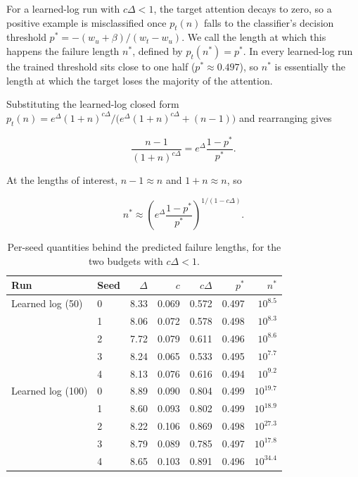 \documentclass{article}
\begin{document}
For a learned-log run with $c\Delta<1$, the target attention decays to zero, so
a positive example is misclassified once $p_t(n)$ falls to the classifier's
decision threshold $p^{\ast}=-(w_u+\beta)/(w_t-w_u)$. We call the length at
which this happens the failure length $n^{\ast}$, defined by
$p_t(n^{\ast})=p^{\ast}$. In every learned-log run the trained threshold sits
close to one half ($p^{\ast}\approx0.497$), so $n^{\ast}$ is essentially the
length at which the target loses the majority of the attention.

Substituting the learned-log closed form
$p_t(n)=e^{\Delta}(1+n)^{c\Delta}/\bigl(e^{\Delta}(1+n)^{c\Delta}+(n-1)\bigr)$
and rearranging gives

\begin{equation}
  \frac{n-1}{(1+n)^{c\Delta}}
  =
  e^{\Delta}\frac{1-p^{\ast}}{p^{\ast}}.
  \label{eq:failure-length-identity}
\end{equation}

At the lengths of interest, $n-1\approx n$ and $1+n\approx n$, so

\begin{equation}
  n^{\ast}
  \approx
  \left(
    e^{\Delta}\frac{1-p^{\ast}}{p^{\ast}}
  \right)^{1/(1-c\Delta)}.
  \label{eq:failure-length-approximation}
\end{equation}

\begin{table}[!b]
  \caption{Per-seed quantities behind the predicted failure lengths, for the
  two budgets with $c\Delta<1$.}
  \label{tab:failure-lengths}
  \centering
  \small
  \setlength{\tabcolsep}{4pt}
  \begin{tabular}{llrrrrr}
    \toprule
    Run & Seed & $\Delta$ & $c$ & $c\Delta$ & $p^{\ast}$ & $n^{\ast}$ \\
    \midrule
    Learned log (50) & 0 & 8.33 & 0.069 & 0.572 & 0.497 & $10^{8.5}$ \\
    & 1 & 8.06 & 0.072 & 0.578 & 0.498 & $10^{8.3}$ \\
    & 2 & 7.72 & 0.079 & 0.611 & 0.496 & $10^{8.6}$ \\
    & 3 & 8.24 & 0.065 & 0.533 & 0.495 & $10^{7.7}$ \\
    & 4 & 8.13 & 0.076 & 0.616 & 0.494 & $10^{9.2}$ \\
    \addlinespace
    Learned log (100) & 0 & 8.89 & 0.090 & 0.804 & 0.499 & $10^{19.7}$ \\
    & 1 & 8.60 & 0.093 & 0.802 & 0.499 & $10^{18.9}$ \\
    & 2 & 8.22 & 0.106 & 0.869 & 0.498 & $10^{27.3}$ \\
    & 3 & 8.79 & 0.089 & 0.785 & 0.497 & $10^{17.8}$ \\
    & 4 & 8.65 & 0.103 & 0.891 & 0.496 & $10^{34.4}$ \\
    \bottomrule
  \end{tabular}
\end{table}
\end{document}
